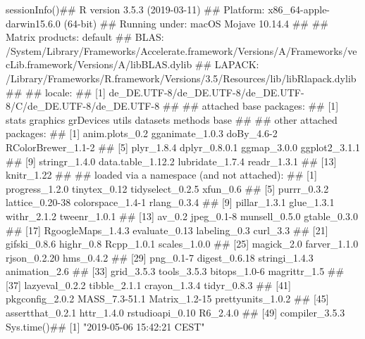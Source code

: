 \documentclass{article}\usepackage[]{graphicx}\usepackage[]{color}
\begin{document}
sessionInfo()## R version 3.5.3 (2019-03-11)
## Platform: x86_64-apple-darwin15.6.0 (64-bit)
## Running under: macOS Mojave 10.14.4
## 
## Matrix products: default
## BLAS: /System/Library/Frameworks/Accelerate.framework/Versions/A/Frameworks/vecLib.framework/Versions/A/libBLAS.dylib
## LAPACK: /Library/Frameworks/R.framework/Versions/3.5/Resources/lib/libRlapack.dylib
## 
## locale:
## [1] de_DE.UTF-8/de_DE.UTF-8/de_DE.UTF-8/C/de_DE.UTF-8/de_DE.UTF-8
## 
## attached base packages:
## [1] stats     graphics  grDevices utils     datasets  methods   base     
## 
## other attached packages:
##  [1] anim.plots_0.2     gganimate_1.0.3    doBy_4.6-2         RColorBrewer_1.1-2
##  [5] plyr_1.8.4         dplyr_0.8.0.1      ggmap_3.0.0        ggplot2_3.1.1     
##  [9] stringr_1.4.0      data.table_1.12.2  lubridate_1.7.4    readr_1.3.1       
## [13] knitr_1.22        
## 
## loaded via a namespace (and not attached):
##  [1] progress_1.2.0    tinytex_0.12      tidyselect_0.2.5  xfun_0.6         
##  [5] purrr_0.3.2       lattice_0.20-38   colorspace_1.4-1  rlang_0.3.4      
##  [9] pillar_1.3.1      glue_1.3.1        withr_2.1.2       tweenr_1.0.1     
## [13] av_0.2            jpeg_0.1-8        munsell_0.5.0     gtable_0.3.0     
## [17] RgoogleMaps_1.4.3 evaluate_0.13     labeling_0.3      curl_3.3         
## [21] gifski_0.8.6      highr_0.8         Rcpp_1.0.1        scales_1.0.0     
## [25] magick_2.0        farver_1.1.0      rjson_0.2.20      hms_0.4.2        
## [29] png_0.1-7         digest_0.6.18     stringi_1.4.3     animation_2.6    
## [33] grid_3.5.3        tools_3.5.3       bitops_1.0-6      magrittr_1.5     
## [37] lazyeval_0.2.2    tibble_2.1.1      crayon_1.3.4      tidyr_0.8.3      
## [41] pkgconfig_2.0.2   MASS_7.3-51.1     Matrix_1.2-15     prettyunits_1.0.2
## [45] assertthat_0.2.1  httr_1.4.0        rstudioapi_0.10   R6_2.4.0         
## [49] compiler_3.5.3
Sys.time()## [1] "2019-05-06 15:42:21 CEST"
\end{document}
